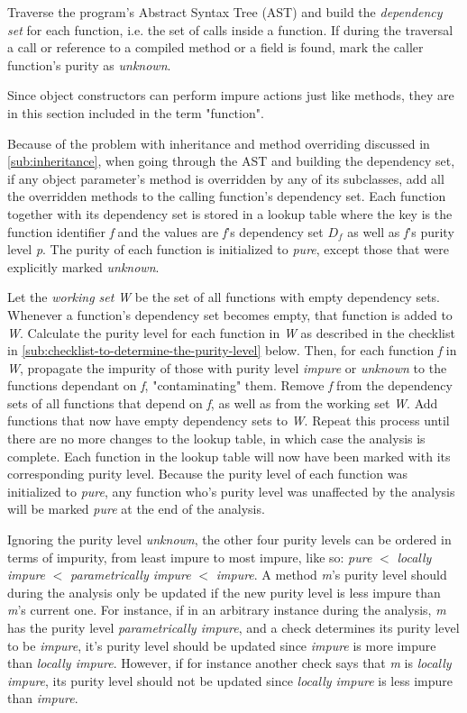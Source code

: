 \documentclass[a4paper,12pt]{article}
\begin{document}
Traverse the program's Abstract Syntax Tree (AST) and build the \textit{dependency set} for each function, i.e. the set of calls inside a function. If during the traversal a call or reference to a compiled method or a field is found, mark the caller function's purity as \textit{unknown}.

Since object constructors can perform impure actions just like methods, they are in this section included in the term "function".

Because of the problem with inheritance and method overriding discussed in \autoref{sub:inheritance}, when going through the AST and building the dependency set, if any object parameter's method is overridden by any of its subclasses, add all the overridden methods to the calling function's dependency set. Each function together with its dependency set is stored in a lookup table where the key is the function identifier \textit{f} and the values are \textit{f}'s dependency set $D_f$ as well as \textit{f}'s purity level \textit{p}. The purity of each function is initialized to \textit{pure}, except those that were explicitly marked \textit{unknown}.

Let the \textit{working set} \textit{W} be the set of all functions with empty dependency sets. Whenever a function's dependency set becomes empty, that function is added to \textit{W}. Calculate the purity level for each function in \textit{W} as described in the checklist in \autoref{sub:checklist-to-determine-the-purity-level} below. Then, for each function \textit{f} in \textit{W}, propagate the impurity of those with purity level \textit{impure} or \textit{unknown} to the functions dependant on \textit{f}, "contaminating" them. Remove \textit{f} from the dependency sets of all functions that depend on \textit{f}, as well as from the working set \textit{W}. Add functions that now have empty dependency sets to \textit{W}. Repeat this process until there are no more changes to the lookup table, in which case the analysis is complete. Each function in the lookup table will now have been marked with its corresponding purity level. Because the purity level of each function was initialized to \textit{pure}, any function who's purity level was unaffected by the analysis will be marked \textit{pure} at the end of the analysis.

Ignoring the purity level \textit{unknown}, the other four purity levels can be ordered in terms of impurity, from least impure to most impure, like so: \textit{pure} $<$ \textit{locally impure} $<$ \textit{parametrically impure} $<$ \textit{impure}. A method \textit{m}'s purity level should during the analysis only be updated if the new purity level is less impure than \textit{m}'s current one. For instance, if in an arbitrary instance during the analysis, \textit{m} has the purity level \textit{parametrically impure}, and a check determines its purity level to be \textit{impure}, it's purity level should be updated since \textit{impure} is more impure than \textit{locally impure}. However, if for instance another check says that \textit{m} is \textit{locally impure}, its purity level should not be updated since \textit{locally impure} is less impure than \textit{impure}.
\end{document}
